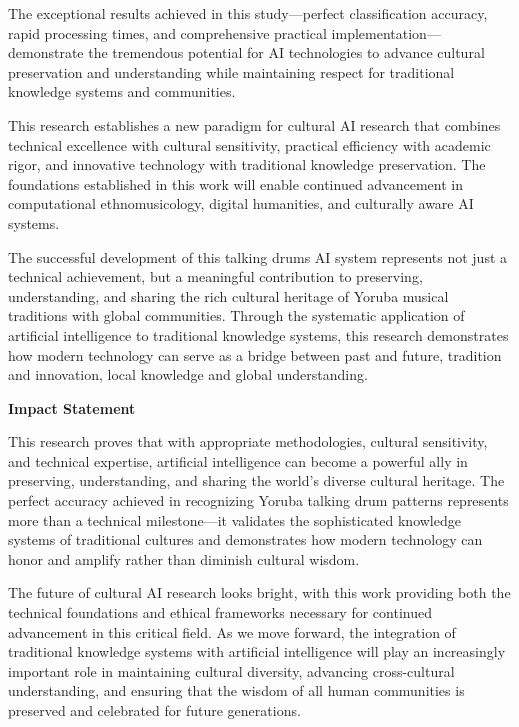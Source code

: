 \documentclass[12pt,a4paper]{article}
\begin{document}
The exceptional results achieved in this study—perfect classification accuracy, rapid processing times, and comprehensive practical implementation—demonstrate the tremendous potential for AI technologies to advance cultural preservation and understanding while maintaining respect for traditional knowledge systems and communities.

This research establishes a new paradigm for cultural AI research that combines technical excellence with cultural sensitivity, practical efficiency with academic rigor, and innovative technology with traditional knowledge preservation. The foundations established in this work will enable continued advancement in computational ethnomusicology, digital humanities, and culturally aware AI systems.

The successful development of this talking drums AI system represents not just a technical achievement, but a meaningful contribution to preserving, understanding, and sharing the rich cultural heritage of Yoruba musical traditions with global communities. Through the systematic application of artificial intelligence to traditional knowledge systems, this research demonstrates how modern technology can serve as a bridge between past and future, tradition and innovation, local knowledge and global understanding.

\textbf{Impact Statement}

This research proves that with appropriate methodologies, cultural sensitivity, and technical expertise, artificial intelligence can become a powerful ally in preserving, understanding, and sharing the world's diverse cultural heritage. The perfect accuracy achieved in recognizing Yoruba talking drum patterns represents more than a technical milestone—it validates the sophisticated knowledge systems of traditional cultures and demonstrates how modern technology can honor and amplify rather than diminish cultural wisdom.

The future of cultural AI research looks bright, with this work providing both the technical foundations and ethical frameworks necessary for continued advancement in this critical field. As we move forward, the integration of traditional knowledge systems with artificial intelligence will play an increasingly important role in maintaining cultural diversity, advancing cross-cultural understanding, and ensuring that the wisdom of all human communities is preserved and celebrated for future generations.


\end{document}

